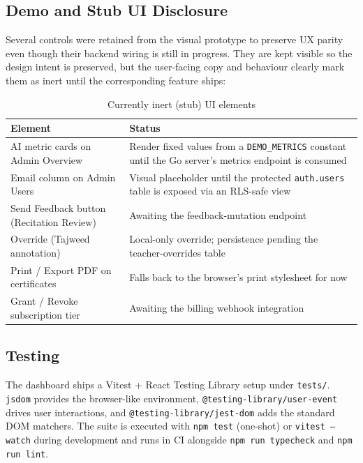 
\subsection{Demo and Stub UI Disclosure}

Several controls were retained from the visual prototype to preserve UX parity even though their backend wiring is still in progress. They are kept visible so the design intent is preserved, but the user-facing copy and behaviour clearly mark them as inert until the corresponding feature ships:

\begin{table}[H]
  \centering
  \caption{Currently inert (stub) UI elements}
  \label{tab:impl_dash_stubs}
  \renewcommand{\arraystretch}{1.3}
  \begin{tabular}{lp{8cm}}
    \toprule
    \textbf{Element} & \textbf{Status} \\
    \midrule
    AI metric cards on Admin Overview & Render fixed values from a \texttt{DEMO\_METRICS} constant until the Go server's metrics endpoint is consumed \\
    Email column on Admin Users        & Visual placeholder until the protected \texttt{auth.users} table is exposed via an RLS-safe view \\
    Send Feedback button (Recitation Review) & Awaiting the feedback-mutation endpoint \\
    Override (Tajweed annotation)            & Local-only override; persistence pending the teacher-overrides table \\
    Print / Export PDF on certificates & Falls back to the browser's print stylesheet for now \\
    Grant / Revoke subscription tier   & Awaiting the billing webhook integration \\
    \bottomrule
  \end{tabular}
\end{table}

\subsection{Testing}

The dashboard ships a Vitest + React Testing Library setup under \texttt{tests/}. \texttt{jsdom} provides the browser-like environment, \texttt{@testing-library/user-event} drives user interactions, and \texttt{@testing-library/jest-dom} adds the standard DOM matchers. The suite is executed with \texttt{npm test} (one-shot) or \texttt{vitest --watch} during development and runs in CI alongside \texttt{npm run typecheck} and \texttt{npm run lint}.

